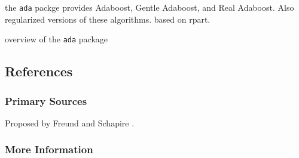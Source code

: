 the \texttt{ada} packge provides Adaboost, Gentle Adaboost, and Real Adaboost. Also regularized versions of these algorithms. based on rpart.

overview of the \texttt{ada} package \cite{Culp2006}


\subsection{References}

\subsubsection{Primary Sources}

Proposed by Freund and Schapire \cite{Freund1997}.

\subsubsection{More Information}



